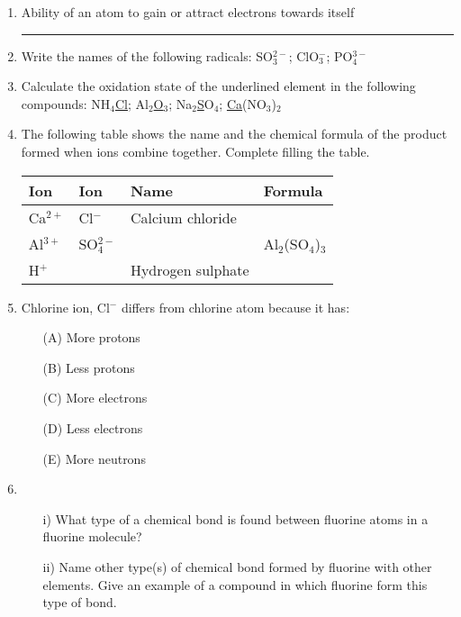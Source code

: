 \begin{enumerate}
	\item Ability of an atom to gain or attract electrons towards itself \rule{1.5cm}{0.15mm}
	
	\item Write the names of the following radicals: SO$_3^{2-}$; ClO$_3^-$; PO$_4^{3-}$
	
	\item Calculate the oxidation state of the underlined element in the following compounds: NH$_4$\underline{Cl}; Al$_2$\underline{O$_3$}; Na$_2$\underline{S}O$_4$; \underline{Ca}(NO$_3$)$_2$

	\item The following table shows the name and the chemical formula of the product formed when ions combine together. Complete filling the table.
	\begin{center}
		\begin{tabular}{|p{3cm}|p{3cm}|p{3cm}|p{3cm}|} \hline
			Ion & Ion & Name & Formula \\ \hline
			Ca$^{2+}$ & Cl$^-$ & Calcium chloride & \\ \hline
			Al$^{3+}$ & SO$_4^{2-}$ & & Al$_2$(SO$_4$)$_3$ \\ \hline
			H$^+$ & & Hydrogen sulphate & \\ \hline
		\end{tabular}
	\end{center}
	
	\item Chlorine ion, Cl$^-$ differs from chlorine atom because it has:
	\begin{enumerate}[topsep=0ex,itemsep=0ex,partopsep=1ex,parsep=1ex]
		\item[(A)] More protons
		\item[(B)] Less protons
		\item[(C)] More electrons
		\item[(D)] Less electrons
		\item[(E)] More neutrons
	\end{enumerate}
	
	\item 
	\begin{enumerate}[topsep=0ex,itemsep=0ex,partopsep=1ex,parsep=1ex]
		\item[i)] What type of a chemical bond is found between fluorine atoms in a fluorine molecule?
		\item[ii)] Name other type(s) of chemical bond formed by fluorine with other elements. Give an example of a compound in which fluorine form this type of bond.
	\end{enumerate}
	
\end{enumerate}













